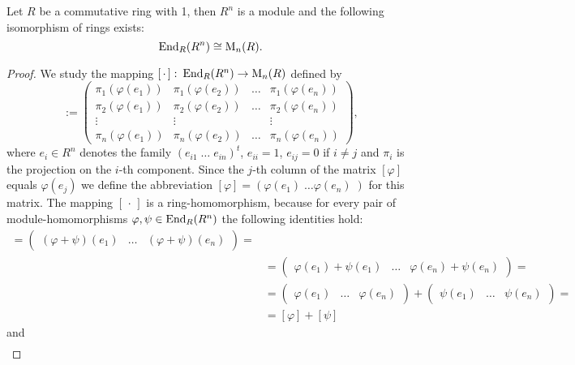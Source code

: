 \begin{pro}\label{prop.Matrix isomorph Homomorphism}
Let $R$ be a commutative ring with 1, then $R^n$ is a module and the following isomorphism of rings exists:
\begin{equation*}
\operatorname{\mathrm{End}}_R(R^n)\cong \mathrm{M}_n(R).
\end{equation*}
\end{pro}
\begin{proof}
We study the mapping $\left[\,\cdot\,\right]\colon\operatorname{\mathrm{End}}_R(R^n)\to\mathrm{M}_n(R)$ defined by
\begin{equation*}
[\varphi]:=
\begin{pmatrix}
\pi_1(\varphi(e_1)) & \pi_1(\varphi(e_2)) & \ldots & \pi_1(\varphi(e_n))\\
\pi_2(\varphi(e_1)) & \pi_2(\varphi(e_2)) & \ldots & \pi_2(\varphi(e_n))\\
\vdots &\vdots & &\vdots\\
\pi_n(\varphi(e_1)) & \pi_n(\varphi(e_2)) & \ldots & \pi_n(\varphi(e_n))
\end{pmatrix},
\end{equation*}
where $e_i\in R^n$ denotes the family $\left(e_{i1}\;\ldots\;e_{in}\right)^t$, $e_{ii}=1$, $e_{ij}=0$ if $i\neq j$ and $\pi_i$ is the projection on the $i$-th component. Since the $j$-th column of the matrix $[\varphi]$ equals $\varphi(e_j)$ we define the abbreviation $[\varphi]=\left(\varphi(e_1)\;\ldots\varphi(e_n)\;\right)$ for this matrix. The mapping $\left[\,\cdot\,\right]$ is a ring-homomorphism, because for every pair of module-homomorphisms $\varphi,\psi\in\operatorname{\mathrm{End}}_R(R^n)$ the following identities hold:
\begin{align*}
[\varphi&+\psi]=\begin{pmatrix}(\varphi+\psi)(e_1) & \dots & (\varphi+\psi)(e_n)\end{pmatrix}=\\
    &=\begin{pmatrix}\varphi(e_1)+\psi(e_1) & \dots & \varphi(e_n)+\psi(e_n)\end{pmatrix}=\\
    &=\begin{pmatrix}\varphi(e_1) & \ldots & \varphi(e_n)\end{pmatrix}+\begin{pmatrix}\psi(e_1) & \ldots & \psi(e_n)\end{pmatrix}=\\
    &=[\varphi]+[\psi]
\end{align*}
and
\begin{align*}

\end{align*}
\end{proof}
